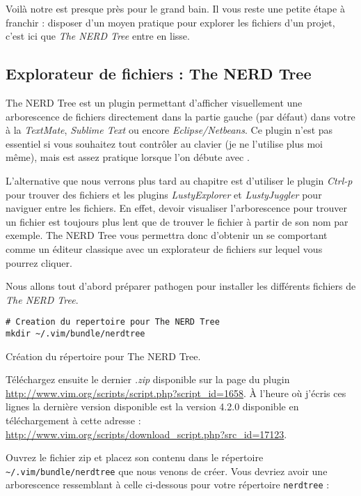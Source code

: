 Voilà notre \vim est presque près pour le grand bain. Il vous reste une petite étape à franchir : disposer d'un moyen pratique pour explorer les fichiers d'un projet, c'est ici que \emph{The NERD Tree} entre en lisse.

\subsection{Explorateur de fichiers : The NERD Tree}

The NERD Tree est un plugin permettant d'afficher visuellement une arborescence de fichiers directement dans la partie gauche (par défaut) dans votre \vim à la \emph{TextMate}, \emph{Sublime Text} ou encore \emph{Eclipse/Netbeans}. Ce plugin n'est pas essentiel si vous souhaitez tout contrôler au clavier (je ne l'utilise plus moi même), mais est assez pratique lorsque l'on débute avec \vim.

L'alternative que nous verrons plus tard au chapitre \TODO est d'utiliser le plugin \emph{Ctrl-p} pour trouver des fichiers et les plugins \emph{LustyExplorer} et \emph{LustyJuggler} pour naviguer entre les fichiers. En effet, devoir visualiser l'arborescence pour trouver un fichier est toujours plus lent que de trouver le fichier à partir de son nom par exemple. The NERD Tree vous permettra donc d'obtenir un \vim se comportant comme un éditeur classique avec un explorateur de fichiers sur lequel vous pourrez cliquer.

Nous allons tout d'abord préparer pathogen pour installer les différents fichiers de \emph{The NERD Tree}.

\begin{listing}[H]
\begin{verbatim}
# Creation du repertoire pour The NERD Tree
mkdir ~/.vim/bundle/nerdtree
\end{verbatim}
  \caption{Création du répertoire pour The NERD Tree.}
  \label{code:nerdtree-bundle}
\end{listing}

Téléchargez ensuite le dernier \emph{.zip} disponible sur la page du plugin \url{http://www.vim.org/scripts/script.php?script_id=1658}. À l'heure où j'écris ces lignes la dernière version disponible est la version 4.2.0 disponible en téléchargement à cette adresse : \url{http://www.vim.org/scripts/download_script.php?src_id=17123}.

Ouvrez le fichier zip et placez son contenu dans le répertoire \Verb|~/.vim/bundle/nerdtree| que nous venons de créer. Vous devriez avoir une arborescence ressemblant à celle ci-dessous pour votre répertoire \Verb|nerdtree| :


